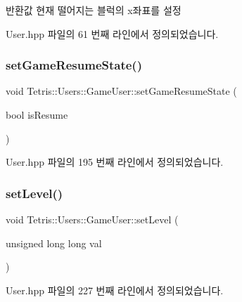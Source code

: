 \begin{DoxyReturn}{반환값}
현재 떨어지는 블럭의 x좌표를 설정 
\end{DoxyReturn}


User.\+hpp 파일의 61 번째 라인에서 정의되었습니다.

\mbox{\label{class_tetris_1_1_users_1_1_game_user_a10d5ff75a132346fd1947ea14bcea7ab}} 
\subsubsection{\texorpdfstring{set\+Game\+Resume\+State()}{setGameResumeState()}}
{\footnotesize\ttfamily void Tetris\+::\+Users\+::\+Game\+User\+::set\+Game\+Resume\+State (\begin{DoxyParamCaption}\item[{bool}]{is\+Resume }\end{DoxyParamCaption})\hspace{0.3cm}{\ttfamily [inline]}}



User.\+hpp 파일의 195 번째 라인에서 정의되었습니다.

\mbox{\label{class_tetris_1_1_users_1_1_game_user_a40603ad69564036b53b99cdd67fe5451}} 
\subsubsection{\texorpdfstring{set\+Level()}{setLevel()}}
{\footnotesize\ttfamily void Tetris\+::\+Users\+::\+Game\+User\+::set\+Level (\begin{DoxyParamCaption}\item[{unsigned long long}]{val }\end{DoxyParamCaption})\hspace{0.3cm}{\ttfamily [inline]}}



User.\+hpp 파일의 227 번째 라인에서 정의되었습니다.

